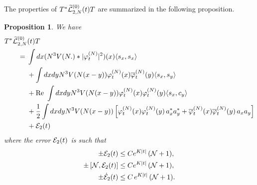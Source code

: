 \documentclass[11pt,a4paper]{article}
\newtheorem{proposition}[thm]{Proposition}
\newcommand{\ech}[2]{#2}	%
\newcommand{\ekt}{e^{K\lvert t\rvert}}	%
\newcommand{\wt}{\widetilde}
\newcommand{\cE}{{\cal E}}
\newcommand{\cL}{{\cal L}}
\newcommand{\cN}{{\cal N}}
\begin{document}
The properties of $T^* \wt{\cL}_{2,N}^{(0)} (t) T$ are summarized in the following proposition.
\begin{proposition}\label{prop:TwtL2T}
We have 
\begin{equation} \begin{split} 
T^* \wt{\cL}_{2,N}^{(0)} &(t) T \\ =\; & \int dx (N^3 V(N.) * |\varphi_t^{(N)}|^2) (x) \langle s_x , s_x \rangle \\ &+ \int dx dy N^3 V(N (x-y)) \varphi_t^{(N)} (x) \overline{\varphi}_t^{(N)} (y) \langle s_x , s_y \rangle \\ &+ \text{Re } \int dx dy N^3 V(N (x-y)) \varphi_t^{(N)} (x) \varphi_t^{(N)} (y) \langle s_x ,c_y \rangle \\ &+ \frac{1}{2} \int dx dy N^3 V(N (x-y)) \left[ \varphi_t^{(N)} (x) \varphi_t^{(N)} (y)\, a_x^* a_y^*  + \overline{\varphi}_t^{(N)} (x) \overline{\varphi}_t^{(N)} (y) \, a_x a_y \right]  \\ &+ \cE_2 (t) \end{split} \end{equation}
where the error $\cE_2 (t)$ is such that 
\begin{equation} \label{eq:T2T-cl}
\begin{split}
\pm  \cE_2 (t) &\leq C \ech{\| \varphi_t^{(N)} \|_{H^2}^2}{\ekt} \,  (\cN + 1), \\  \pm \left[ \cN , \cE_2 (t) \right]  &\leq C \ech{\| \varphi_t^{(N)} \|_{H^2}^2}{\ekt} \, (\cN + 1), \\ \pm \dot{\cE}_2 (t) &\leq C \, \ech{\left(\| \varphi_t^{(N)} \|_{H^4} \| \varphi_t^{(N)} \|_{H^2} +   \| \varphi_t^{(N)} \|_{H^2}^3 \right)}{\ekt} \, (\cN+1) .
\end{split}
\end{equation} 
\end{proposition}
\end{document}
